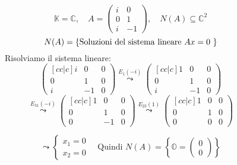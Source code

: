 \documentclass[a4paper]{article}
\theoremstyle{break}
\theoremstyle{break}
\theoremstyle{break}
\theoremstyle{break}
\begin{document}
\begin{figure}[H]
  \begin{example}
    \[
    \mathbb{K} = \mathbb{C}, \quad A = \begin{pmatrix} 
      i & 0 \\
      0 & 1 \\
      i & -1
    \end{pmatrix} 
    , \quad
    N(A) \subseteq \mathbb{C}^2
    \] 
    \[
    N(A) = \{\text{Soluzioni del sistema lineare \( Ax=0 \) }\} 
    \] 
    Risolviamo il sistema lineare:
    \[
      \begin{pmatrix}[cc|c]
        i & 0 & 0\\
        0 & 1 & 0\\
        i & -1 & 0
    \end{pmatrix}
    \stackrel{E_1(-i)}{\leadsto}
    \begin{pmatrix}[cc|c]
      1 & 0 & 0\\
      0 & 1 & 0\\
      i & -1 & 0
    \end{pmatrix} 
    \] 
    \[
      \stackrel{E_{31}(-i)}{\leadsto}
      \begin{pmatrix}[cc|c]
        1 & 0 & 0\\
        0 & 1 & 0\\
        0 & -1 & 0
      \end{pmatrix} 
      \stackrel{E_{23}(1)}{\leadsto}
      \begin{pmatrix}[cc|c]
        1 & 0 & 0\\
        0 & 1 & 0\\
        0 & 0 & 0
      \end{pmatrix} 
    \] 
    
    \[
    \leadsto \begin{cases}
      x_1 = 0 \\
      x_2 = 0
    \end{cases}
    \quad \text{Quindi } N(A) = \left\{ \mathbb{O}=\begin{pmatrix} 0\\0 \end{pmatrix}  \right\} 
    \] 
  \end{example}
\end{figure}
\end{document}
